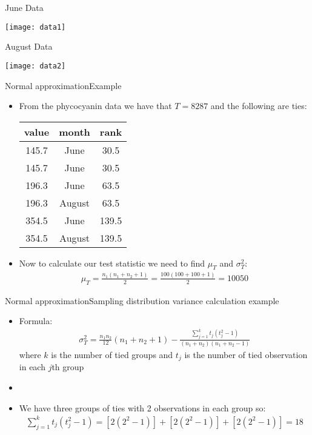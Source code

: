 \documentclass[xcolor=dvipsnames]{beamer}
\begin{document}
\begin{frame}{June Data}
	\begin{center}
		\texttt{[image: data1]}
	\end{center}
\end{frame}

\begin{frame}{August Data}
	\begin{center}
		\texttt{[image: data2]}
	\end{center}
\end{frame}

\begin{frame}{Normal approximation}{Example}
	\begin{itemize}
		\item From the phycocyanin data we have that $T = 8287$ and the following are ties: 
		\begin{center}
			\begin{tabular}{|c|c|c|}
					\hline
				  \textbf{value} & \textbf{month}&  \textbf{rank} \\ \hline \hline
				 145.7  & June &  30.5\\ \hline
				 145.7  & June &  30.5\\ \hline
				 196.3  & June &  63.5\\ \hline
				 196.3 &August &  63.5\\ \hline
				 354.5 &  June & 139.5\\ \hline
				 354.5& August & 139.5\\ \hline
			\end{tabular}
		\end{center} \pause
	\item Now to calculate our test statistic we need to find $\mu_T$ and $\sigma_T^2$:
	\begin{align*}
		\mu_T = \frac{n_1 (n_1 + n_2 + 1)}{2} = \frac{100(100+100+1)}{2} = 10050
	\end{align*}
	\end{itemize}
\end{frame}

\begin{frame}{Normal approximation}{Sampling distribution variance calculation example}
\begin{itemize}
	\item Formula: 	
	\begin{gather*}
	\sigma_T^{2} = \frac{n_1 n_2}{12}(n_1 +n_2 +1)- \frac{\sum_{j=1}^k t_j (t_j^2-1)}{(n_1+n_2)(n_1+n_2-1)}
	\end{gather*}
	where $k$ is the number of tied groups and $t_j$ is the number of tied observation in each $j$th group \pause
	\item[]
	\item We have three groups of ties with 2 observations in each group so:
	\begin{gather*}
		\sum_{j=1}^k t_j (t_j^2-1) =  [2(2^2 -1)] + [2(2^2 -1)] + [2(2^2 -1)] = 18
	\end{gather*}
\end{itemize}
\end{frame}
\end{document}
